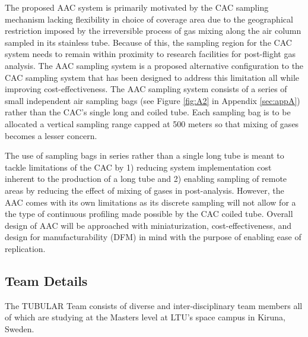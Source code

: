 \documentclass[a4paper,12pt,oneside]{article} %
\begin{document}
The proposed AAC system is primarily motivated by the CAC sampling mechanism lacking flexibility in choice of coverage area due to the geographical restriction imposed by the irreversible process of gas mixing along the air column sampled in its stainless tube. Because of this, the sampling region for the CAC system needs to remain within proximity to research facilities for post-flight gas analysis. The AAC sampling system is a proposed alternative configuration to the CAC sampling system that has been designed to address this limitation all while improving cost-effectiveness. The AAC sampling system consists of a series of small independent air sampling bags (see Figure \ref{fig:A2} in Appendix \ref{sec:appA}) rather than the CAC's single long and coiled tube. Each sampling bag is to be allocated a vertical sampling range capped at 500 meters so that mixing of gases becomes a lesser concern.

The use of sampling bags in series rather than a single long tube is meant to tackle limitations of the CAC by 1) reducing system implementation cost inherent to the production of a long tube and 2) enabling sampling of remote areas by reducing the effect of mixing of gases in post-analysis. However, the AAC comes with its own limitations as its discrete sampling will not allow for a the type of continuous profiling made possible by the CAC coiled tube. Overall design of AAC will be approached with miniaturization, cost-effectiveness, and design for manufacturability (DFM) in mind with the purpose of enabling ease of replication.
\pagebreak
\subsection{Team Details}
The TUBULAR Team consists of diverse and inter-disciplinary team members all of which are studying at the Masters level at LTU's space campus in Kiruna, Sweden. 

\bigskip
\end{document}
